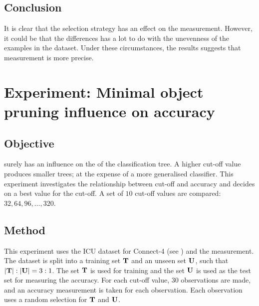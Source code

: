 
\subsection{Conclusion}
It is clear that the selection strategy has an effect on the measurement.  However, it could be that the differences has a lot to do with the unevenness of the examples in the dataset. Under these circumstances, the results suggests that  measurement is more precise.   

\section{Experiment: Minimal object pruning influence on accuracy}
\subsection{Objective}
 surely has an influence on the  of the classification tree.    A higher cut-off value produces smaller trees; at the expense of a more generalised classifier. This experiment investigates the relationship between cut-off and accuracy and decides on a best value for the cut-off. A set of $10$ cut-off values are compared: $32, 64, 96, \ldots, 320$.
\subsection{Method}
This experiment uses the ICU dataset for Connect-4 (see ) and the  measurement.  The dataset is split into a training set ${\bf T}$ and an unseen set ${\bf U}$, such that $|{\bf T}|:|{\bf U}| = 3:1$.  The set ${\bf T}$ is used for training and the set ${\bf U}$ is used as the test set for measuring the accuracy.   
For each cut-off value, $30$ observations are made, and an accuracy measurement is taken for each observation.  Each observation uses a random selection for ${\bf T}$ and ${\bf U}$.   
